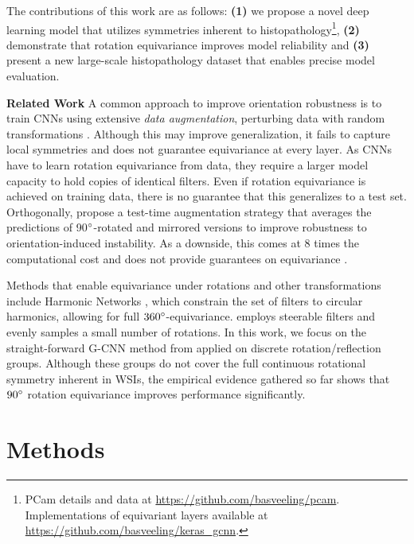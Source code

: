 \documentclass{llncs}
\newcommand{\citet}[1]{\cite{#1}}
\begin{document}
    The contributions of this work are as follows: \textbf{(1)} we propose a novel deep learning model that utilizes symmetries inherent to histopathology\footnote{\label{footnote}PCam details and data at \url{https://github.com/basveeling/pcam}. Implementations of equivariant layers available at \url{https://github.com/basveeling/keras_gcnn}.}, \textbf{(2)} demonstrate that rotation equivariance improves model reliability and \textbf{(3)} present a new large-scale histopathology dataset that enables precise model evaluation.
    
    
\par\textbf{Related Work} A common approach to improve orientation robustness is to train CNNs using extensive \textit{data augmentation}, perturbing data with random transformations \cite{Liu2017-jq,Litjens2017-zt}. Although this may improve generalization, it fails to capture local symmetries and does not guarantee equivariance at every layer. As CNNs have to learn rotation equivariance from data, they require a larger model capacity to hold copies of identical filters. Even if rotation equivariance is achieved on training data, there is no guarantee that this generalizes to a test set. Orthogonally, \citet{Liu2017-jq,Ciresan2013-wv} propose a test-time augmentation strategy that averages the predictions of 90$\degree$-rotated and mirrored versions to improve robustness to orientation-induced instability. As a downside, this comes at 8 times the computational cost and does not provide guarantees on equivariance \cite{Lenc2015-ih}.

Methods that enable equivariance under rotations and other transformations include Harmonic Networks \cite{Worrall2017-ji}, which constrain the set of filters to circular harmonics, allowing for full $360\degree$-equivariance. \cite{Weiler2017-oz} employs steerable filters and evenly samples a small number of rotations. In this work, we focus on the straight-forward G-CNN method from \citet{Cohen2016-do} applied on discrete rotation/reflection groups. Although these groups do not cover the full continuous rotational symmetry inherent in WSIs, the empirical evidence gathered so far shows that $ 90\degree$ rotation equivariance improves performance significantly\cite{Weiler2017-oz}. 

\section{Methods}
\end{document}
